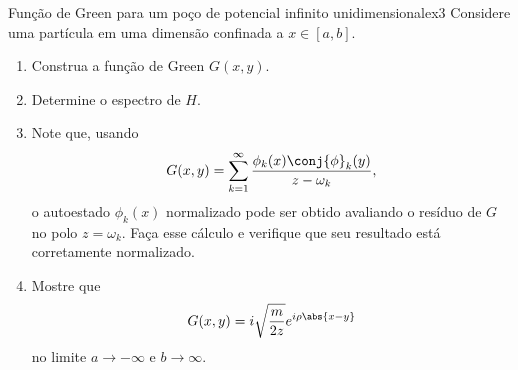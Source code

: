 \begin{exercício}{Função de Green para um poço de potencial infinito unidimensional}{ex3}
   Considere uma partícula em uma dimensão confinada a \(x \in [a,b].\)
   \begin{enumerate}[label=(\alph*)]
       \item Construa a função de Green \(G(x,y)\).
       \item Determine o espectro de \(H\).
       \item Note que, usando
          \begin{equation*}
             G(x,y) = \sum_{k = 1}^\infty \frac{\phi_k(x) \conj{\phi}_k(y)}{z - \omega_k},
          \end{equation*}
          o autoestado \(\phi_k(x)\) normalizado pode ser obtido avaliando o resíduo de \(G\) no polo \(z = \omega_k\). Faça esse cálculo e verifique que seu resultado está corretamente normalizado.
       \item Mostre que
          \begin{equation*}
             G(x,y) = i \sqrt{\frac{m}{2z}} e^{i \rho \abs{x - y}}
          \end{equation*}
          no limite \(a \to -\infty\) e \(b \to \infty\).
   \end{enumerate}
\end{exercício}
